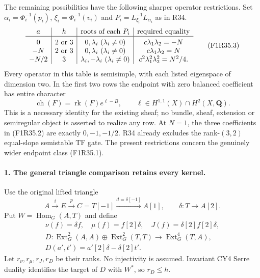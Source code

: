 The remaining possibilities have the following sharper
operator restrictions. Set
$\alpha_i=\Phi_i^{-1}(p_i)$,
$\xi_i=\Phi_i^{-1}(v_i)$ and
$P_i=L_{\xi_i}^{-1}L_{\alpha_i}$ as in R34.
\[
\begin{array}{c|c|c|c}
 a&h&\text{roots of each }P_i&\text{required equality}\\ \hline
 0&2\text{ or }3&0,\lambda_i\ (\lambda_i\ne0)
          &c\lambda_1\lambda_2=-N\rule{0pt}{2.6ex}\\
 -N&2\text{ or }3&0,\lambda_i\ (\lambda_i\ne0)
          &c\lambda_1\lambda_2=N\\
 -N/2&3&\lambda_i,-\lambda_i\ (\lambda_i\ne0)
          &c^2\lambda_1^2\lambda_2^2=N^2/4.
\end{array}
\tag{F1R35.3}
\]
Every operator in this table is semisimple, with each
listed eigenspace of dimension two. In the first two
rows the endpoint with zero balanced coefficient has
entire character
\[
          \operatorname{ch}(F)=\operatorname{rk}(F)e^{\ell-B},
               \qquad \ell\in H^{1,1}(X)\cap H^2(X,\mathbf Q).
 \tag{F1R35.4}
\]
This is a necessary identity for the existing sheaf;
no bundle, sheaf, extension or semiregular object is
asserted to realize any row. At $N=1$, the three
coefficients in (F1R35.2) are exactly $0,-1,-1/2$.
R34 already excludes the rank-$(3,2)$ equal-slope
semistable TF gate. The present restrictions concern
the genuinely wider endpoint class (F1R35.1).

\paragraph{1. The general triangle comparison retains every kernel.}
Use the original lifted triangle
\[
 A\xrightarrow{i}E\xrightarrow{p}C=T[-1]
             \xrightarrow{d=\delta[-1]}A[1],
                    \qquad \delta:T\longrightarrow A[2].
 \tag{F1R35.5}
\]
Put $W=\operatorname{Hom}_G(A,T)$ and define
\[
 \begin{gathered}
 \nu(f)=\delta f,\quad\mu(f)=f[2]\delta,\quad
 J(f)=\delta[2]f[2]\delta,\\
 D:\operatorname{Ext}^2_G(A,A)\oplus\operatorname{Ext}^2_G(T,T)
       \longrightarrow\operatorname{Ext}^4_G(T,A),\\
 D(a',t')=a'[2]\delta-\delta[2]t'.
 \end{gathered}
 \tag{F1R35.6}
\]
Let $r_\nu,r_\mu,r_J,r_D$ be their ranks.
No injectivity is assumed. Invariant CY4 Serre duality
identifies the target of $D$ with $W^*$, so $r_D\le h$.

